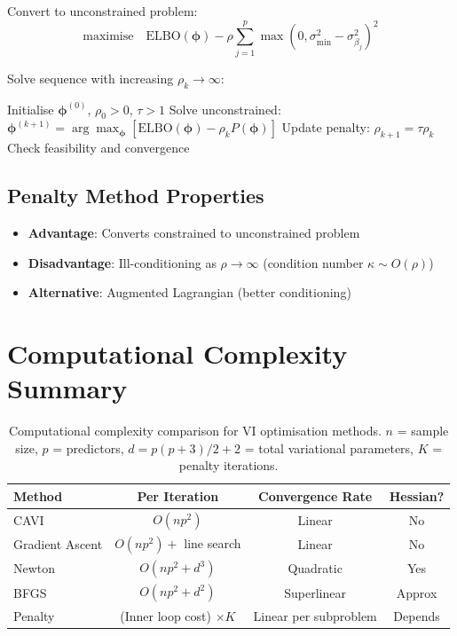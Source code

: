 \documentclass[11pt]{article}
\newcommand{\ELBO}{\text{ELBO}}
\begin{document}
Convert to unconstrained problem:
\begin{equation}
\text{maximise} \quad \ELBO(\bm{\phi}) - \rho \sum_{j=1}^{p} \max(0, \sigma^2_{\min} - \sigma^2_{\beta_j})^2
\end{equation}

Solve sequence with increasing $\rho_k \to \infty$:
\begin{algorithm}
\caption{Penalty Method for Constrained VI}
\begin{algorithmic}[1]
\State Initialise $\bm{\phi}^{(0)}$, $\rho_0 > 0$, $\tau > 1$
    \State Solve unconstrained: $\bm{\phi}^{(k+1)} = \arg\max_{\bm{\phi}} \left[\ELBO(\bm{\phi}) - \rho_k P(\bm{\phi})\right]$
    \State Update penalty: $\rho_{k+1} = \tau \rho_k$
    \State Check feasibility and convergence
\EndFor
\end{algorithmic}
\end{algorithm}

\subsection{Penalty Method Properties}

\begin{itemize}
\item \textbf{Advantage}: Converts constrained to unconstrained problem
\item \textbf{Disadvantage}: Ill-conditioning as $\rho \to \infty$ (condition number $\kappa \sim O(\rho)$)
\item \textbf{Alternative}: Augmented Lagrangian (better conditioning)
\end{itemize}

\section{Computational Complexity Summary}

\begin{table}[h]
\centering
\begin{tabular}{lccc}
\hline
\textbf{Method} & \textbf{Per Iteration} & \textbf{Convergence Rate} & \textbf{Hessian?} \\
\hline
CAVI & $O(np^2)$ & Linear & No \\
Gradient Ascent & $O(np^2) + $ line search & Linear & No \\
Newton & $O(np^2 + d^3)$ & Quadratic & Yes \\
BFGS & $O(np^2 + d^2)$ & Superlinear & Approx \\
Penalty & (Inner loop cost) $\times K$ & Linear per subproblem & Depends \\
\hline
\end{tabular}
\caption{Computational complexity comparison for VI optimisation methods. $n$ = sample size, $p$ = predictors, $d = p(p+3)/2 + 2$ = total variational parameters, $K$ = penalty iterations.}
\end{table}
\end{document}
